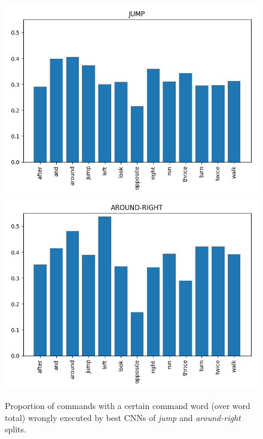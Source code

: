 \begin{figure}[tb]
    \centering
    \includegraphics[width=.4\textwidth,keepaspectratio]{figures/jump_error_dist.png}
    \includegraphics[width=.4\textwidth,keepaspectratio]{figures/template_error_dist.png}
    \caption{Proportion of commands with a certain command word (over word
      total) wrongly executed by best CNNs of
       \emph{jump} and \emph{around-right} splits.}
    \label{fig:error_distributions}
\end{figure}

